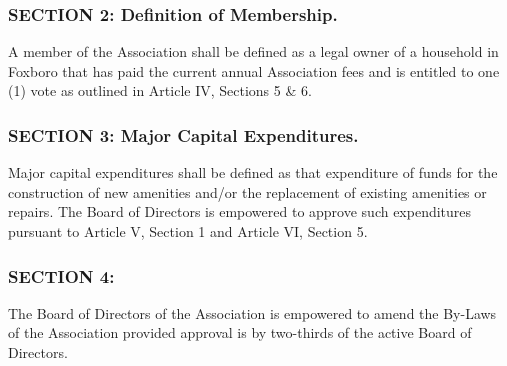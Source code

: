 \subsubsection{SECTION 2: Definition of Membership.}
A member of the Association shall be defined as a legal owner of a
household in Foxboro that has paid the current annual Association fees and
is entitled to one (1) vote as outlined in Article IV, Sections 5 \& 6.

\subsubsection{SECTION 3: Major Capital Expenditures.}
Major capital expenditures shall be defined as that expenditure of funds
for the construction of new amenities and/or the replacement of existing
amenities or repairs. The Board of Directors is empowered to approve such
expenditures pursuant to Article V, Section 1 and Article VI, Section 5.

\subsubsection{SECTION 4:}
The Board of Directors of the Association is empowered to amend the
By-Laws of the Association provided approval is by two-thirds of the
active Board of Directors.


